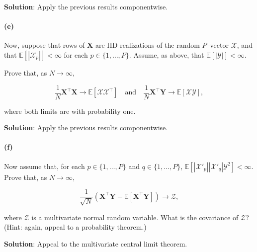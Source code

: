 \documentclass[
  letterpaper,
  DIV=11,
  numbers=noendperiod]{scrartcl}
\let\oldparagraph\paragraph
\renewcommand{\paragraph}[1]{\oldparagraph{#1}\mbox{}}
\begin{document}
\textbf{Solution}: Apply the previous results componentwise.

\hypertarget{e}{%
\paragraph{(e)}\label{e}}

Now, suppose that rows of \(\boldsymbol{X}\) are IID realizations of the
random \(P\)--vector \(\mathcal{X}\), and that
\(\mathbb{E}\left[|\mathcal{X}_p|\right] < \infty\) for each
\(p \in \{ 1, \ldots, P \}\). Assume, as above, that
\(\mathbb{E}\left[|\mathcal{Y}|\right] < \infty\).

Prove that, as \(N \rightarrow \infty\),

\[
\frac{1}{N} \boldsymbol{X}^\intercal\boldsymbol{X}\rightarrow
    \mathbb{E}\left[\mathcal{X} \mathcal{X}^\intercal\right]
\quad\textrm{and}\quad
\frac{1}{N} \boldsymbol{X}^\intercal\boldsymbol{Y}\rightarrow
    \mathbb{E}\left[\mathcal{X} \mathcal{Y}\right],
\]

where both limits are with probability one.

\textbf{Solution}: Apply the previous results componentwise.

\hypertarget{f}{%
\paragraph{(f)}\label{f}}

Now assume that, for each \(p \in \{1, \ldots, P\}\) and
\(q \in \{1, \ldots, P\}\),
\(\mathbb{E}\left[\left|\mathcal{X}'_p\right| \left|\mathcal{X}'_q\right| \mathcal{Y}^2\right] < \infty\).
Prove that, as \(N \rightarrow \infty\),

\[
\frac{1}{\sqrt{N}}
\left( \boldsymbol{X}^\intercal\boldsymbol{Y}- \mathbb{E}\left[\boldsymbol{X}^\intercal\boldsymbol{Y}\right] \right) \rightarrow \mathcal{Z},
\]

where \(\mathcal{Z}\) is a multivariate normal random variable. What is
the covariance of \(\mathcal{Z}\)? (Hint: again, appeal to a probability
theorem.)

\textbf{Solution}: Appeal to the multivariate central limit theorem.
\end{document}
